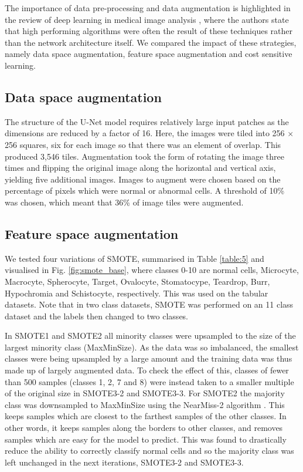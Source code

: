 \documentclass[final,5p,times,twocolumn,authoryear]{elsarticle}
\begin{document}
The importance of data pre-processing and data augmentation is highlighted in the review of deep learning in medical image analysis \citep{Litjens2017AAnalysis}, where the authors state that high performing algorithms were often the result of these techniques rather than the network architecture itself. We compared the impact of these strategies, namely data space augmentation, feature space augmentation and cost sensitive learning.




\subsection{Data space augmentation}
\label{subsec:subsec05}
The structure of the U-Net model requires relatively large input patches as the dimensions are reduced by a factor of 16. Here, the images were tiled into 256 $\times$ 256 squares, six for each image so that there was an element of overlap. This produced 3,546 tiles. Augmentation took the form of rotating the image three times and flipping the original image along the horizontal and vertical axis, yielding five additional images. Images to augment were chosen based on the percentage of pixels which were normal or abnormal cells. A threshold of 10\% was chosen, which meant that 36\% of image tiles were augmented. 


\subsection{Feature space augmentation}
\label{subsec:subsec04}

We tested four variations of SMOTE, summarised in Table \ref{table:5} and visualised in Fig. \ref{fig:smote_base}, where classes 0-10 are normal cells, Microcyte, Macrocyte, Spherocyte, Target, Ovalocyte, Stomatocype, Teardrop, Burr, Hypochromia and Schistocyte, respectively. This was used on the tabular datasets. Note that in two class datasets, SMOTE was performed on an 11 class dataset and the labels then changed to two classes.

In SMOTE1 and SMOTE2 all minority classes were upsampled to the size of the largest minority class (MaxMinSize). As the data was so imbalanced, the smallest classes were being upsampled by a large amount and the training data was thus made up of largely augmented data. To check the effect of this, classes of fewer than 500 samples (classes 1, 2, 7 and 8) were instead taken to a smaller multiple of the original size in SMOTE3-2 and SMOTE3-3.
For SMOTE2 the majority class was downsampled to MaxMinSize using the NearMiss-2 algorithm \citep{Lemaitre2017Imbalanced-learn:Learning}. This keeps samples which are closest to the farthest samples of the other classes. In other words, it keeps samples along the borders to other classes, and removes samples which are easy for the model to predict. This was found to drastically reduce the ability to correctly classify normal cells and so the majority class was left unchanged in the next iterations, SMOTE3-2 and SMOTE3-3.
\end{document}
